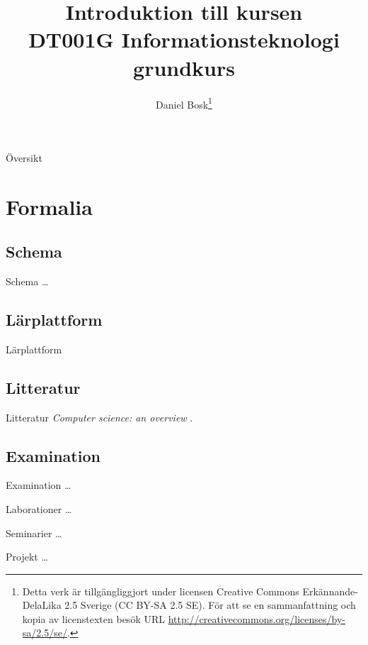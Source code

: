\documentclass{beamer}
\title[Introduktion]{%
	Introduktion till kursen\\
	DT001G Informationsteknologi grundkurs
}
\author{Daniel Bosk\footnote{%
	\tiny
	Detta verk är tillgängliggjort under licensen Creative Commons 
	Erkännande-DelaLika 2.5 Sverige (CC BY-SA 2.5 SE).
	För att se en sammanfattning och kopia av licenstexten besök URL 
	\url{http://creativecommons.org/licenses/by-sa/2.5/se/}.
}}
\institute[MIUN ITM]{%
  Avdelningen för informations- och kommunikationssytem (IKS),\\
  Mittuniversitetet, Sundsvall.
}
\date{\svnId}
\begin{document}
\begin{frame}
  \titlepage
\end{frame}

\begin{frame}{Översikt}
	\tableofcontents
\end{frame}





\section{Formalia}

\subsection{Schema}
\begin{frame}{Schema}
	\dots
\end{frame}

\subsection{Lärplattform}
\begin{frame}{Lärplattform}
\end{frame}

\subsection{Litteratur}
\begin{frame}{Litteratur}
	\emph{Computer science: an overview} \cite{Brookshear2012csa}.
\end{frame}

\subsection{Examination}
\begin{frame}{Examination}
	\dots
\end{frame}
\begin{frame}{Laborationer}
	\dots
\end{frame}
\begin{frame}{Seminarier}
	\dots
\end{frame}
\begin{frame}{Projekt}
	\dots
\end{frame}
\end{document}
